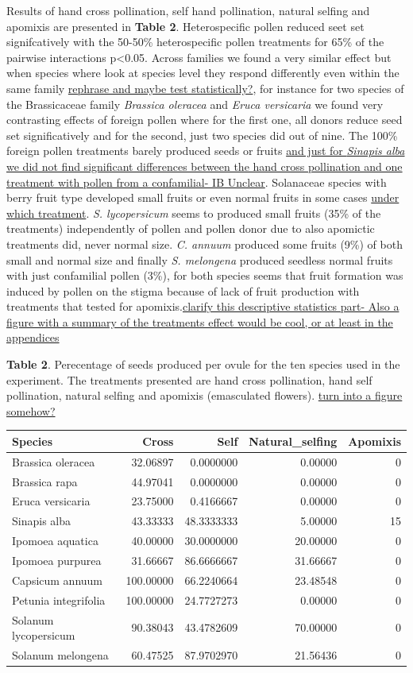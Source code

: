 \documentclass[11pt,a4paper]{article}
\begin{document}
Results of hand cross pollination, self hand pollination, natural
selfing and apomixis are presented in \textbf{Table 2}. Heterospecific
pollen reduced seet set signifcatively with the 50-50\% heterospecific
pollen treatments for 65\% of the pairwise interactions
p\textless{}0.05. Across families we found a very similar effect but
when species where look at species level they respond differently even
within the same family \href{}{rephrase and maybe test statistically?},
for instance for two species of the Brassicaceae family \emph{Brassica
oleracea} and \emph{Eruca versicaria} we found very contrasting effects
of foreign pollen where for the first one, all donors reduce seed set
significatively and for the second, just two species did out of nine.
The 100\% foreign pollen treatments barely produced seeds or fruits
\href{}{and just for \emph{Sinapis alba} we did not find significant
differences between the hand cross pollination and one treatment with
pollen from a confamilial- IB Unclear}. Solanaceae species with berry
fruit type developed small fruits or even normal fruits in some cases
\href{}{under which treatment}. \emph{S. lycopersicum} seems to produced
small fruits (35\% of the treatments) independently of pollen and pollen
donor due to also apomictic treatments did, never normal size. \emph{C.
annuum} produced some fruits (9\%) of both small and normal size and
finally \emph{S. melongena} produced seedless normal fruits with just
confamilial pollen (3\%), for both species seems that fruit formation
was induced by pollen on the stigma because of lack of fruit production
with treatments that tested for apomixis.\href{}{clarify this
descriptive statistics part- Also a figure with a summary of the
treatments effect would be cool, or at least in the appendices}

\newpage

\textbf{Table 2}. Perecentage of seeds produced per ovule for the ten
species used in the experiment. The treatments presented are hand cross
pollination, hand self pollination, natural selfing and apomixis
(emasculated flowers). \href{}{turn into a figure somehow?}

\begin{longtable}[]{@{}lrrrr@{}}
\toprule
Species & Cross & Self & Natural\_selfing & Apomixis\tabularnewline
\midrule
\endhead
Brassica oleracea & 32.06897 & 0.0000000 & 0.00000 & 0\tabularnewline
Brassica rapa & 44.97041 & 0.0000000 & 0.00000 & 0\tabularnewline
Eruca versicaria & 23.75000 & 0.4166667 & 0.00000 & 0\tabularnewline
Sinapis alba & 43.33333 & 48.3333333 & 5.00000 & 15\tabularnewline
Ipomoea aquatica & 40.00000 & 30.0000000 & 20.00000 & 0\tabularnewline
Ipomoea purpurea & 31.66667 & 86.6666667 & 31.66667 & 0\tabularnewline
Capsicum annuum & 100.00000 & 66.2240664 & 23.48548 & 0\tabularnewline
Petunia integrifolia & 100.00000 & 24.7727273 & 0.00000 &
0\tabularnewline
Solanum lycopersicum & 90.38043 & 43.4782609 & 70.00000 &
0\tabularnewline
Solanum melongena & 60.47525 & 87.9702970 & 21.56436 & 0\tabularnewline
\bottomrule
\end{longtable}
\end{document}
